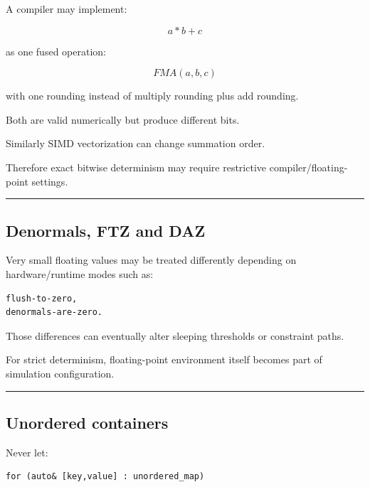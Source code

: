 \hypertarget{06-engine-ii-ch039-fma-and-compiler-differences}{}

A compiler may implement:

\[
a*b+c
\]

as one fused operation:

\[
FMA(a,b,c)
\]

with one rounding instead of multiply rounding plus add rounding.

Both are valid numerically but produce different bits.

Similarly SIMD vectorization can change summation order.

Therefore exact bitwise determinism may require restrictive compiler/floating-point settings.

\begin{center}\rule{0.5\linewidth}{0.5pt}\end{center}

\subsection{Denormals, FTZ and DAZ}\label{06-engine-ii-ch039-denormals-ftz-and-daz}

\hypertarget{06-engine-ii-ch039-denormals-ftz-and-daz}{}

Very small floating values may be treated differently depending on hardware/runtime modes such as:

\begin{verbatim}
flush-to-zero,
denormals-are-zero.
\end{verbatim}

Those differences can eventually alter sleeping thresholds or constraint paths.

For strict determinism, floating-point environment itself becomes part of simulation configuration.

\begin{center}\rule{0.5\linewidth}{0.5pt}\end{center}

\subsection{Unordered containers}\label{06-engine-ii-ch039-unordered-containers}

\hypertarget{06-engine-ii-ch039-unordered-containers}{}

Never let:

\begin{verbatim}
for (auto& [key,value] : unordered_map)
\end{verbatim}

